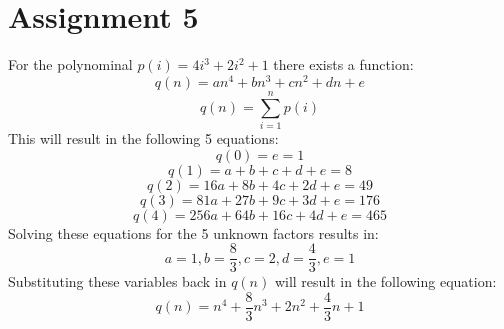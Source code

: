 \documentclass[a4paper,12px]{article}
\begin{document}
\section{Assignment 5}
For the polynominal $p(i)=4i^{3} + 2i^{2} + 1$ there exists a function: $$q(n) =
an^{4} + bn^{3} + cn^{2} + dn + e$$ $$q(n) = \sum\limits_{i=1}^n p(i)$$ This
will result in the following 5 equations:
$$q(0) = e = 1$$
$$q(1) = a + b + c + d + e = 8$$
$$q(2) = 16a + 8b + 4c + 2d + e = 49$$
$$q(3) = 81a + 27b + 9c + 3d + e = 176$$
$$q(4) = 256a + 64b + 16c + 4d + e = 465$$
Solving these equations for the 5 unknown factors results in:
$$ a = 1, b = \frac{8}{3}, c = 2, d = \frac{4}{3}, e = 1$$
Substituting these variables back in $q(n)$ will result in the following
equation:
$$q(n) = n^{4} + \frac{8}{3} n^{3} + 2n^{2} + \frac{4}{3} n + 1$$

%
%
\end{document}
